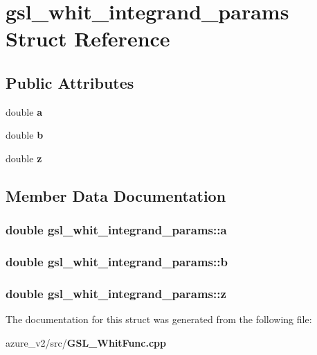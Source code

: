 \section{gsl\_\-whit\_\-integrand\_\-params Struct Reference}
\label{structgsl__whit__integrand__params}
\subsection*{Public Attributes}
\begin{CompactItemize}
\item 
double \bf{a}
\item 
double \bf{b}
\item 
double \bf{z}
\end{CompactItemize}


\subsection{Member Data Documentation}
\subsubsection{\setlength{\rightskip}{0pt plus 5cm}double \bf{gsl\_\-whit\_\-integrand\_\-params::a}}\label{structgsl__whit__integrand__params_269fbd13508ae3b66cd2a635565ddb12}


\subsubsection{\setlength{\rightskip}{0pt plus 5cm}double \bf{gsl\_\-whit\_\-integrand\_\-params::b}}\label{structgsl__whit__integrand__params_2cb905be9f161432254783093f014414}


\subsubsection{\setlength{\rightskip}{0pt plus 5cm}double \bf{gsl\_\-whit\_\-integrand\_\-params::z}}\label{structgsl__whit__integrand__params_803cdbc6128a3772b3d1a77a8f44ce95}




The documentation for this struct was generated from the following file:\begin{CompactItemize}
\item 
azure\_\-v2/src/\bf{GSL\_\-Whit\-Func.cpp}\end{CompactItemize}
